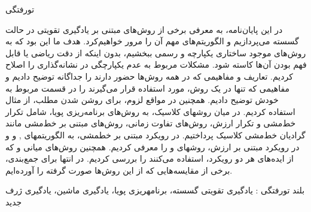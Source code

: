 


\pagestyle{empty}

‌تورفتگی

 در این پایان‌نامه، به معرفی برخی از روش‌های مبتنی بر یادگیری تقویتی در حالت گسسته می‌پردازیم و الگوریتم‌های مهم آن را مرور خواهیم‌کرد. 
هدف ما این بود که به روش‌های موجود ساختاری یکپارچه و رسمی ببخشیم،
 بدون اینکه از دقت ریاضی یا قابل فهم بودن آن‌ها کاسته شود.
 مشکلات مربوط به عدم یکپارچگی در نشانه‌گذاری را اصلاح کردیم.
 تعاریف و مفاهیمی که در همه روش‌ها حضور دارند را جداگانه توضیح دادیم و مفاهیمی که تنها در یک روش، مورد استفاده قرار می‌گیرند را در قسمت مربوط به خودش توضیح دادیم.
همچنین در مواقع لزوم، برای روشن شدن مطلب، از مثال استفاده کردیم.
در میان روش\nf های کلاسیک، به روش‌های برنامه‌ریزی پویا، شامل تکرار خط‌مشی و تکرار ارزش، روش‌های تفاوت زمانی، روش‌های مبتنی بر خط‌مشی مانند گرادیان خط‌مشی کلاسیک پرداختیم.  در رویکرد مبتنی بر خط\nf مشی، به الگوریتم\nf های
,
و
و در رویکرد مبتنی بر ارزش، روش\nf های
و
را معرفی کردیم. همچنین روش‌های میانی 
و
که از ایده‌های هر دو رویکرد، استفاده می‌کنند را بررسی کردیم.
در انتها برای جمع‌بندی، برخی از مقایسه‌هایی که از این روش‌ها صورت گرفته را آورده‌ایم.


‌بلند
‌تورفتگی : 
یادگیری تقویتی گسسته، برنامه\nf ریزی پویا، یادگیری ماشین، یادگیری ژرف
‌جدید
